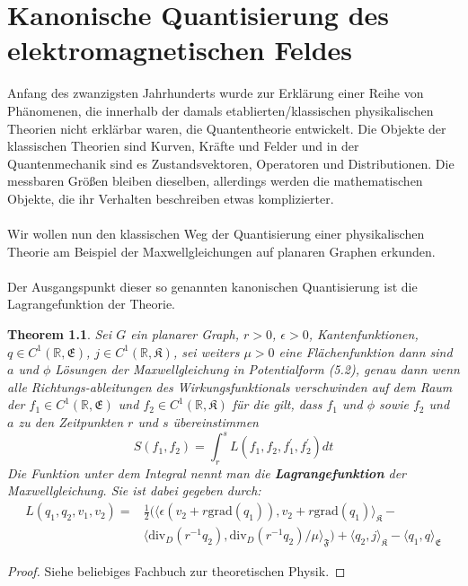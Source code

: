 \documentclass[11pt,a4paper,leqno]{report}
\newtheorem{theorem}{Theorem}[chapter]
\numberwithin{equation}{chapter}
\begin{document}
\chapter{Kanonische Quantisierung des elektromagnetischen Feldes}
Anfang des zwanzigsten Jahrhunderts wurde zur Erkl\"arung einer Reihe von Ph\"anomenen, die innerhalb der damals etablierten/klassischen physikalischen Theorien nicht erkl\"arbar waren, die Quantentheorie entwickelt.
Die Objekte der klassischen Theorien sind Kurven, Kr\"afte und Felder und in der Quantenmechanik sind es Zustandsvektoren, Operatoren und Distributionen. Die messbaren Gr\"o\ss{}en bleiben dieselben, allerdings werden die mathematischen Objekte, die ihr Verhalten beschreiben etwas komplizierter.\\
\\
Wir wollen nun den klassischen Weg der Quantisierung einer physikalischen Theorie am Beispiel der Maxwellgleichungen auf planaren Graphen erkunden.\\
\\
Der Ausgangspunkt dieser so genannten kanonischen Quantisierung ist die Lagrangefunktion der Theorie.
\begin{theorem}
Sei $G$ ein planarer Graph, $r>0$, $\epsilon>0$,  Kantenfunktionen, $q\in C^1(\mathbb{R}, \mathfrak{E})$, $j\in C^1(\mathbb{R}, \mathfrak{K})$, sei weiters $\mu>0$ eine Fl\"achenfunktion dann sind $a$ und $\phi$ L\"osungen der Maxwellgleichung in Potentialform (5.2), genau dann wenn alle Richtungs-ableitungen des Wirkungsfunktionals verschwinden auf dem Raum der $f_1\in C^1(\mathbb{R}, \mathfrak{E})$ und $f_2\in C^1(\mathbb{R}, \mathfrak{K})$ f\"ur die gilt, dass $f_1$ und $\phi$ sowie $f_2$ und $a$ zu den Zeitpunkten $r$ und $s$ \"ubereinstimmen
\begin{equation}
	S(f_1, f_2) = \int_{r}^{s}L(f_1, f_2, f_1^\prime, f_2^\prime)dt
\end{equation}
\noindent
Die Funktion unter dem Integral nennt man die \textbf{Lagrangefunktion} der Maxwellgleichung.
Sie ist dabei gegeben durch:
\begin{align*}
	L(q_1, q_2, v_1, v_2) =&\frac{1}{2}(\langle \epsilon(v_2 + r\text{grad}(q_1)), v_2 + r\text{grad}(q_1)\rangle_\mathfrak{K} -\\& \langle\text{div}_D(r^{-1}q_2), \text{div}_D(r^{-1}q_2)/\mu\rangle_\mathfrak{F}) + \langle q_2, j\rangle_\mathfrak{K} - \langle q_1, q\rangle_\mathfrak{E}
\end{align*}
\end{theorem}
\begin{proof}
Siehe beliebiges Fachbuch zur theoretischen Physik.
\end{proof}
\end{document}

